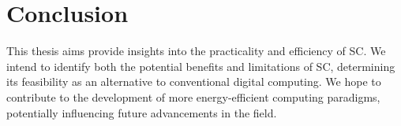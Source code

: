 %
\chapter{Conclusion}
\label{sec:conclusion}

This thesis aims provide insights into the practicality and efficiency of SC. We intend to identify both the potential benefits and limitations of SC, determining its feasibility as an alternative to conventional digital computing. We hope to contribute to the development of more energy-efficient computing paradigms, potentially influencing future advancements in the field.